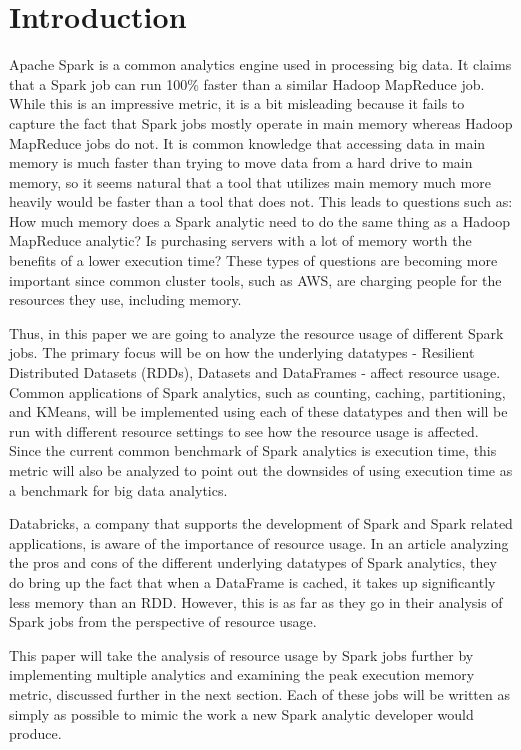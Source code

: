 \documentclass[conference]{IEEEtran}
\begin{document}
\section{Introduction}
Apache Spark is a common analytics engine used in processing big data.
It claims that a Spark job can run 100$\%$ faster than a similar Hadoop MapReduce job. \cite{b9}
While this is an impressive metric, it is a bit misleading because it fails to capture the fact that Spark jobs mostly operate in main memory whereas Hadoop MapReduce jobs do not.
It is common knowledge that accessing data in main memory is much faster than trying to move data from a hard drive to main memory, so it seems natural that a tool that utilizes main memory much more heavily would be faster than a tool that does not.
This leads to questions such as: How much memory does a Spark analytic need to do the same thing as a Hadoop MapReduce analytic?
Is purchasing servers with a lot of memory worth the benefits of a lower execution time?
These types of questions are becoming more important since common cluster tools, such as AWS, are charging people for the resources they use, including memory.

Thus, in this paper we are going to analyze the resource usage of different Spark jobs.
The primary focus will be on how the underlying datatypes - Resilient Distributed Datasets (RDDs), Datasets and DataFrames - affect resource usage.
Common applications of Spark analytics, such as counting, caching, partitioning, and KMeans, will be implemented using each of these datatypes and then will be run with different resource settings to see how the resource usage is affected.
Since the current common benchmark of Spark analytics is execution time, this metric will also be analyzed to point out the downsides of using execution time as a benchmark for big data analytics.

Databricks, a company that supports the development of Spark and Spark related applications, is aware of the importance of resource usage.
In an article analyzing the pros and cons of the different underlying datatypes of Spark analytics, they do bring up the fact that when a DataFrame is cached, it takes up significantly less memory than an RDD. \cite{b1}
However, this is as far as they go in their analysis of Spark jobs from the perspective of resource usage.

This paper will take the analysis of resource usage by Spark jobs further by implementing multiple analytics and examining the peak execution memory metric, discussed further in the next section.
Each of these jobs will be written as simply as possible to mimic the work a new Spark analytic developer would produce.
\end{document}
